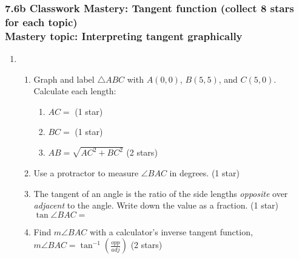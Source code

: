 \documentclass[12pt, twoside]{article}
\begin{document}
\subsubsection*{7.6b Classwork Mastery: Tangent function (collect 8 stars for each topic)\\[0.5cm]
Mastery topic: Interpreting tangent graphically}
  \begin{enumerate}
  \item \begin{enumerate}[itemsep=1.25cm]
    \item Graph and label $\triangle ABC$ with $A(0,0)$, $B(5,5)$, and $C(5,0)$. Calculate each length:
    \begin{multicols}{2}
      \begin{enumerate}
        \item $AC=$ \hfill (1 star)
        \item $BC=$ \hfill (1 star)
        \item $AB=\sqrt{AC^2+BC^2}$ \hfill (2 stars) \vspace{2cm}
      \end{enumerate}
    \begin{center}
    \end{center}
    \end{multicols}\vspace{2cm}
      \item Use a protractor to measure $\angle BAC$ in degrees.  \hfill (1 star)
      \item The tangent of an angle is the ratio of the side lengths \emph{opposite} over \emph{adjacent} to the angle. Write down the value as a fraction.  \hfill (1 star)\\[0.5cm]
        $\tan \angle BAC=$
      \item Find $m\angle BAC$ with a calculator's inverse tangent function,\\ $\displaystyle m \angle BAC = \tan^{-1}(\frac{opp}{adj})$  \hfill (2 stars)
    \end{enumerate}

\newpage

\end{enumerate}
\end{document}
